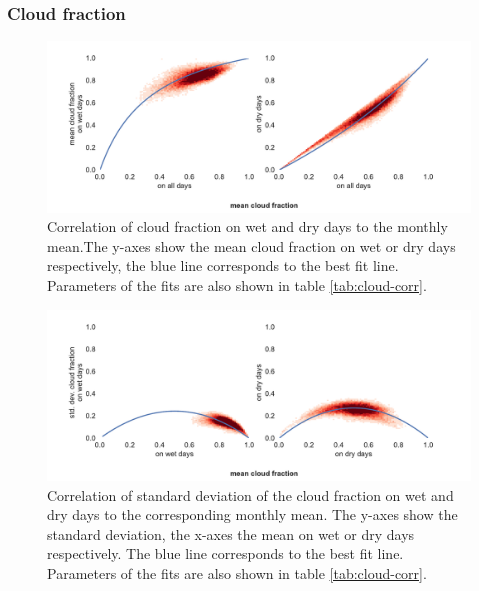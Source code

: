\begin{refsection}
\subsubsection{Cloud fraction}
\begin{figure}
	\includegraphics[width=\linewidth]{gwgen-figures/f08.pdf}
	\caption[Correlation of cloud fraction on wet and dry days to the monthly mean]{Correlation of cloud fraction on wet and dry days to the monthly mean.The y-axes show the mean cloud fraction on wet or dry days respectively, the blue line corresponds to the best fit line. Parameters of the fits are also shown in table \ref{tab:cloud-corr}.}
	\label{fig:cloud}
\end{figure}
\begin{figure}
	\includegraphics[width=\linewidth]{gwgen-figures/f09.pdf}
	\caption[Correlation of standard deviation of cloud fraction to the monthly mean]{Correlation of standard deviation of the cloud fraction on wet and dry days to the corresponding monthly mean. The y-axes show the standard deviation, the x-axes the mean on wet or dry days respectively. The blue line corresponds to the best fit line. Parameters of the fits are also shown in table \ref{tab:cloud-corr}.}
	\label{fig:cloud_sd}
\end{figure}
\begin{table}[t]
	\caption[Fit results of cloud correlation for wet and dry days.]{Fit results of cloud correlation for wet and dry days for figure \ref{fig:cloud}}
	\label{tab:cloud-corr}

\end{table}
\end{refsection}
